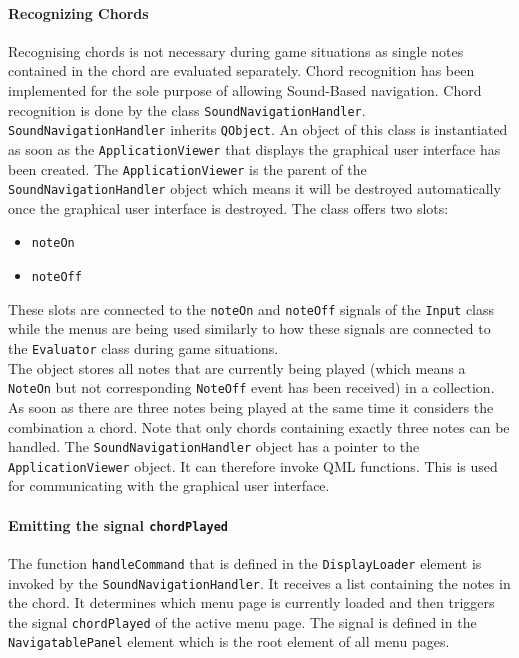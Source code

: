 \paragraph{Recognizing Chords}
Recognising chords is not necessary during game situations as single notes contained in the chord are evaluated separately. Chord recognition has been implemented for the sole purpose of allowing Sound-Based navigation. Chord recognition is done by the class {\tt SoundNavigationHandler}. {\tt SoundNavigationHandler} inherits {\tt QObject}. An object of this class is instantiated as soon as the {\tt ApplicationViewer} that displays the graphical user interface has been created. The {\tt ApplicationViewer} is the parent of the {\tt SoundNavigationHandler} object which means it will be destroyed automatically once the graphical user interface is destroyed. The class offers two slots:
\begin {itemize}
	\item{{\tt noteOn}}
	\item{{\tt noteOff}}
\end {itemize}
These slots are connected to the {\tt noteOn} and {\tt noteOff} signals of the {\tt Input} class while the menus are being used similarly to how these signals are connected to the {\tt Evaluator} class during game situations. \\
The object stores all notes that are currently being played (which means a {\tt NoteOn} but not corresponding {\tt NoteOff} event has been received) in a collection. As soon as there are three notes being played at the same time it considers the combination a chord. Note that only chords containing exactly three notes can be handled. 
The {\tt SoundNavigationHandler} object has a pointer to the {\tt ApplicationViewer} object. It can therefore invoke QML functions. This is used for communicating with the graphical user interface. 
\paragraph{Emitting the signal {\tt chordPlayed}}
The function {\tt handleCommand} that is defined in the {\tt DisplayLoader} element is invoked by the {\tt SoundNavigationHandler}. It receives a list containing the notes in the chord. It determines which menu page is currently loaded and then triggers the signal {\tt chordPlayed} of the active menu page. The signal is defined in the {\tt NavigatablePanel} element which is the root element of all menu pages.
